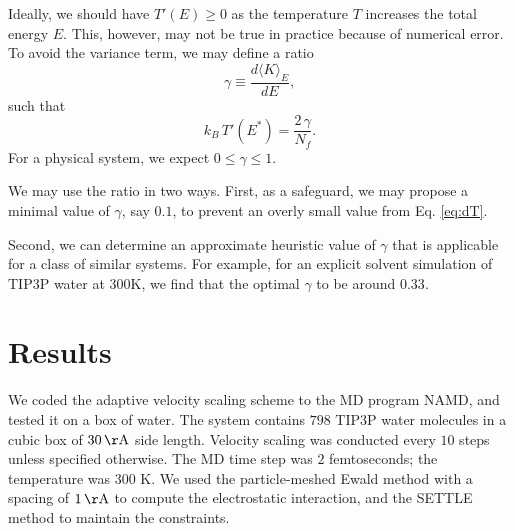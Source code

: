\documentclass[reprint]{revtex4-1}
\begin{document}
Ideally, we should have $T'(E) \ge 0$
as the temperature $T$ increases the total energy $E$.
%
This, however, may not be true in practice
because of numerical error.
%
%
To avoid the variance term,
we may define a ratio
%
\begin{equation}
  \gamma
  \equiv
  \frac
  {
    d \langle K \rangle_E
  }
  {
    dE
  }
  ,
  \label{eq:gamma_def}
\end{equation}
%
such that
%
\begin{equation}
  k_B \, T'(E^*)
  =
  \frac{ 2 \, \gamma } { N_f }
  .
  \label{eq:dT_approx}
\end{equation}
%
For a physical system, we expect $0 \le \gamma \le 1$.
%

We may use the ratio in two ways.
%
First, as a safeguard,
we may propose a minimal value of $\gamma$, say $0.1$,
to prevent an overly small value from Eq. \eqref{eq:dT}.

Second,
we can determine an approximate heuristic value of $\gamma$
that is applicable for a class of similar systems.
%
For example,
for an explicit solvent simulation of TIP3P water\cite{jorgensen1983}
at 300K, we find that the optimal $\gamma$
to be around $0.33$.



\section{Results}



We coded the adaptive velocity scaling scheme to
the MD program NAMD\cite{NAMD},
and tested it on a box of water.
%
The system contains
$798$ TIP3P water molecules\cite{jorgensen1983}
in a cubic box of $30 \, \mathrm{\AA}$ side length.
%
Velocity scaling was conducted every $10$ steps
unless specified otherwise.
%
The MD time step was $2$ femtoseconds;
the temperature was $300$ K.
%
We used the particle-meshed Ewald method\cite{essmann1995}
with a spacing of $1 \, \mathrm{\AA}$
to compute the electrostatic interaction,
and the SETTLE method\cite{miyamoto1992}
to maintain the constraints.
\end{document}
